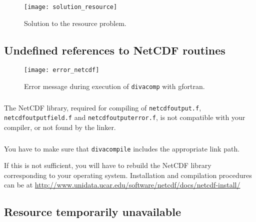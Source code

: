 \begin{figure}[htpb]
\centering
\texttt{[image: solution\_resource]}
\caption{Solution to the resource problem.}
\end{figure}


\subsection{Undefined references to NetCDF routines\label{sec:error_netcdf}}


\begin{figure}[htpb]
\centering
\texttt{[image: error\_netcdf]}
\caption{Error message during execution of \texttt{divacomp} with gfortran\label{fig:error_netcdf}.}
\end{figure}

\subsubsection{\question}

The NetCDF library, required for compiling of \texttt{netcdf\-output.f}, \texttt{netcdf\-output\-field.f} and \texttt{netcdf\-output\-error.f}, is not compatible with your compiler, or not found by the linker.

\subsubsection{\answer}

You have to make sure that \texttt{divacompile} includes the appropriate link path.

If this is not sufficient, you will have to rebuild the NetCDF library corresponding to your operating system. Installation and compilation procedures can be at \url{http://www.unidata.ucar.edu/software/netcdf/docs/netcdf-install/}



\subsection[Resource temporarily unavailable]{Resource temporarily unavailable \label{sec:error_resource}}


